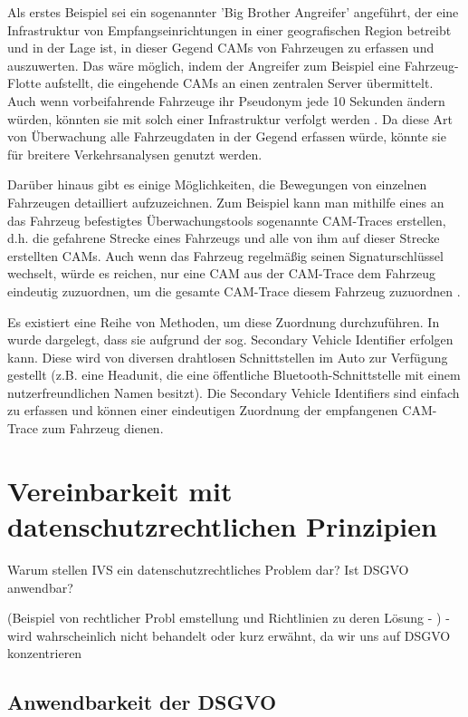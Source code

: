 Als erstes Beispiel sei ein sogenannter 'Big Brother Angreifer' angeführt, der eine Infrastruktur von Empfangseinrichtungen in einer geografischen Region betreibt und in der Lage ist, in dieser Gegend CAMs von Fahrzeugen zu erfassen und auszuwerten. Das wäre möglich, indem der Angreifer zum Beispiel eine Fahrzeug-Flotte aufstellt, die eingehende CAMs an einen zentralen Server übermittelt. Auch wenn vorbeifahrende Fahrzeuge ihr Pseudonym jede 10 Sekunden ändern würden, könnten sie mit solch einer Infrastruktur verfolgt werden \cite{Wiedersheim2010}. Da diese Art von Überwachung alle Fahrzeugdaten in der Gegend erfassen würde, könnte sie für breitere Verkehrsanalysen genutzt werden.
 
Darüber hinaus gibt es einige Möglichkeiten, die Bewegungen von einzelnen Fahrzeugen detailliert aufzuzeichnen. Zum Beispiel kann man mithilfe eines an das Fahrzeug befestigtes Überwachungstools sogenannte CAM-Traces erstellen, d.h. die gefahrene Strecke eines Fahrzeugs und alle von ihm auf dieser Strecke erstellten CAMs. Auch wenn das Fahrzeug regelmäßig seinen Signaturschlüssel wechselt, würde es reichen, nur eine CAM aus der CAM-Trace dem Fahrzeug eindeutig zuzuordnen, um die gesamte CAM-Trace diesem Fahrzeug zuzuordnen \cite{Kiometzis2017}. 

Es existiert eine Reihe von Methoden, um diese Zuordnung durchzuführen. In \cite{Ullmann2016} wurde dargelegt, dass sie aufgrund der sog. Secondary Vehicle Identifier erfolgen kann. Diese wird von diversen drahtlosen Schnittstellen im Auto zur Verfügung gestellt (z.B. eine Headunit, die eine öffentliche Bluetooth-Schnittstelle mit einem nutzerfreundlichen Namen besitzt). Die Secondary Vehicle Identifiers sind einfach zu erfassen und können einer eindeutigen Zuordnung der empfangenen CAM-Trace zum Fahrzeug dienen. 

\section{Vereinbarkeit mit datenschutzrechtlichen Prinzipien}
\label{ch:SecondContentSection}

Warum stellen IVS ein datenschutzrechtliches Problem dar? Ist DSGVO anwendbar? 

(Beispiel von rechtlicher Probl	emstellung und Richtlinien zu deren Lösung - \cite{EUCooperativeV2X} ) - wird wahrscheinlich nicht behandelt oder kurz erwähnt, da wir uns auf DSGVO konzentrieren

\subsection{Anwendbarkeit der DSGVO}
\label{sec:SecondContentSection:SecondSubsection}



